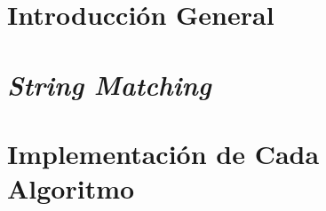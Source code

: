 \documentclass[stu, 11pt, letterpaper, donotrepeattitle, floatsintext, natbib, helv]{apa7}
\begin{document}
\renewcommand{\listalgorithmname}{\largeÍndice de algoritmos}
\listofalgorithms
\newpage


\begin{singlespace}
\section*{Introducción General}
{}

\section*{\textit{String Matching}}%
{}

\section*{Implementación de Cada Algoritmo}
{}

\end{singlespace}
\end{document}
